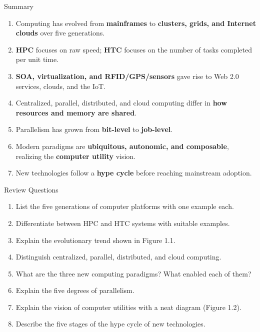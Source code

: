 \begin{frame}{Summary}
\begin{enumerate}
\item<1-> Computing has evolved from \textbf{mainframes} to \textbf{clusters, grids, and Internet clouds} over five generations.
\item<2-> \textbf{HPC} focuses on raw speed; \textbf{HTC} focuses on the number of tasks completed per unit time.
\item<3-> \textbf{SOA, virtualization, and RFID/GPS/sensors} gave rise to Web 2.0 services, clouds, and the IoT.
\item<4-> Centralized, parallel, distributed, and cloud computing differ in \textbf{how resources and memory are shared}.
\item<5-> Parallelism has grown from \textbf{bit-level} to \textbf{job-level}.
\item<6-> Modern paradigms are \textbf{ubiquitous, autonomic, and composable}, realizing the \textbf{computer utility} vision.
\item<7-> New technologies follow a \textbf{hype cycle} before reaching mainstream adoption.
\end{enumerate}
\end{frame}

\begin{frame}{Review Questions}
\begin{enumerate}\small
\item List the five generations of computer platforms with one example each.
\item Differentiate between HPC and HTC systems with suitable examples.
\item Explain the evolutionary trend shown in Figure 1.1.
\item Distinguish centralized, parallel, distributed, and cloud computing.
\item What are the three new computing paradigms? What enabled each of them?
\item Explain the five degrees of parallelism.
\item Explain the vision of computer utilities with a neat diagram (Figure 1.2).
\item Describe the five stages of the hype cycle of new technologies.
\end{enumerate}
\end{frame}
